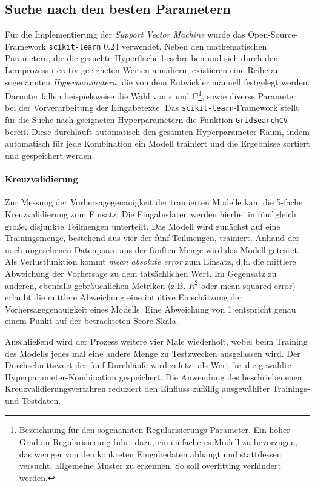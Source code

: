 \subsection{Suche nach den besten Parametern}\label{sec:hyperparams}
Für die Implementierung der \textit{Support Vector Machine} wurde das Open-Source-Framework \texttt{scikit-learn} 0.24 \citep{JMLR:v12:pedregosa11a} verwendet. Neben den mathematischen Parametern, die die gesuchte Hyperfläche beschreiben und sich durch den Lernprozess iterativ geeigneten Werten annähern, existieren eine Reihe an sogenannten \textit{Hyperparametern}, die von dem Entwickler manuell festgelegt werden. Darunter fallen beispielsweise die Wahl von $\epsilon$ und C\footnote{Bezeichnung für den sogenannten Regularisierungs-Parameter. Ein hoher Grad an Regularisierung führt dazu, ein einfacheres Modell zu bevorzugen, das weniger von den konkreten Eingabedaten abhängt und stattdessen versucht, allgemeine Muster zu erkennen. So soll overfitting verhindert werden.}, sowie diverse Parameter bei der Vorverarbeitung der Eingabetexte. Das \texttt{scikit-learn}-Framework stellt für die Suche nach geeigneten Hyperparametern die Funktion \texttt{GridSearchCV} bereit. Diese durchläuft automatisch den gesamten Hyperparameter-Raum, indem automatisch für jede Kombination ein Modell trainiert und die Ergebnisse sortiert und gespeichert werden. 

\paragraph{Kreuzvalidierung} Zur Messung der Vorhersagegenauigkeit der trainierten Modelle kam die 5-fache Kreuzvalidierung zum Einsatz. Die Eingabedaten werden hierbei in fünf gleich große, disjunkte Teilmengen unterteilt. Das Modell wird zunächst auf eine Trainingsmenge, bestehend aus vier der fünf Teilmengen, trainiert. Anhand der noch ungesehenen Datenpaare aus der fünften Menge wird das Modell getestet. Als Verlustfunktion kommt \textit{mean absolute error} zum Einsatz, d.h. die mittlere Abweichung der Vorhersage zu dem tatsächlichen Wert. Im Gegensatz zu anderen, ebenfalls gebräuchlichen Metriken (z.B. $R^2$ oder mean squared error) erlaubt die mittlere Abweichung eine intuitive Einschätzung der Vorhersagegenauigkeit eines Modells. Eine Abweichung von 1 entspricht genau einem Punkt auf der betrachteten Score-Skala.

Anschließend wird der Prozess weitere vier Male wiederholt, wobei beim Training des Modells jedes mal eine andere Menge zu Testzwecken ausgelassen wird. Der Durchschnittswert der fünf Durchläufe wird zuletzt als Wert für die gewählte Hyperparameter-Kombination gespeichert. Die Anwendung des beschriebenenen Kreuzvalidierungsverfahren reduziert den Einfluss zufällig ausgewählter Trainings- und Testdaten.

